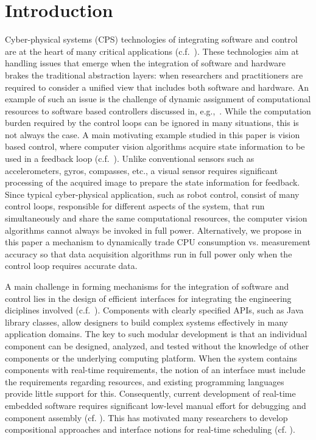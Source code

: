 \documentclass{sig-alternate-ipsn13}
\begin{document}
\section{Introduction}
Cyber-physical systems (CPS) technologies of integrating software and control are at the heart of many critical applications (c.f.~\cite{lee2008cyber}). 
These technologies aim at handling issues that emerge when the integration of software and hardware brakes the traditional abstraction layers: when researchers and practitioners are required to consider a unified view that includes both software and hardware. An example of such an issue is the challenge of dynamic assignment of computational resources to software based controllers discussed in, e.g.,~\cite{arzen2000introduction,tabuada2007event,weiss2007automata}. While the computation burden required by the control loops can be ignored in many situations, this is not always the case. A main motivating example studied in this paper is vision based control, where computer vision algorithms acquire state information to be used in a feedback loop (c.f.~\cite{das2002vision,shakernia1999landing,Efraim2017}). Unlike conventional sensors such as accelerometers, gyros, compasses, etc., a visual sensor requires significant processing of the acquired image to prepare the state information for feedback. Since typical cyber-physical application, such as robot control, consist of many control loops, responsible for different aspects of the system, that run simultaneously and share the same computational resources, the computer vision algorithms cannot always be invoked in full power. Alternatively, we propose in this paper a mechanism to dynamically trade CPU consumption vs. measurement accuracy so that data acquisition algorithms run in full power only when the control loop requires accurate data. 

A main challenge in forming mechanisms for the integration of software and control lies in the design of efficient interfaces for integrating the engineering diciplines involved (c.f.~\cite{weiss2007automata}). Components with clearly specified APIs, such as Java library classes, allow designers to build
complex systems effectively in many application domains.  The key to such modular development is
that an individual component can be designed, analyzed, and tested without the knowledge of other
components or the underlying computing platform. When the system contains components with
real-time requirements, the notion of an interface must include the requirements regarding
resources, and existing programming languages provide little support for this.  Consequently,
current development of real-time embedded software requires significant low-level manual effort for
debugging and component assembly (cf.  \cite{Lee00,IEEE03,HS06}).  This has motivated many
researchers to develop compositional approaches and interface notions for real-time scheduling (cf.
\cite{RS01,dH01,MF01,CAHS03,SL08,SLBS04,TWS06,DBLP:conf/lctrts/AuerbachBIKRRT07}).
\end{document}

